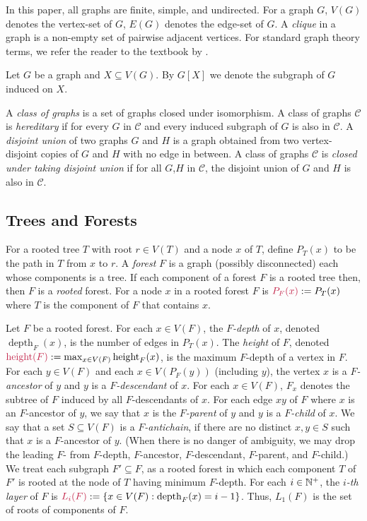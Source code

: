 \documentclass{patmorin}
\makeatletter
\newcommand{\defin}[1]{\emph{\textcolor{brightmaroon}{#1}}}
\def\mathcolor#1#{\@mathcolor{#1}}
\def\@mathcolor#1#2#3{%
  \protect\leavevmode
  \begingroup
    \color#1{#2}#3%
  \endgroup
}
\newcommand{\mathdefin}[1]{\mathcolor{brightmaroon}{#1}}
\DeclareMathOperator{\height}{height}
\DeclareMathOperator{\depth}{depth}
\makeatother
\begin{document}
  In this paper, all graphs are finite, simple, and undirected.  For a graph $G$, \defin{$V(G)$} denotes the vertex-set of $G$, \defin{$E(G)$} denotes the edge-set of $G$.  A \defin{clique} in a graph is a non-empty set of pairwise adjacent vertices. For standard graph theory terms, we refer the reader to the textbook by \citet{diestel:graph}.

  Let $G$ be a graph and $X\subseteq V(G)$. By $G[X]$ we denote the subgraph of $G$ induced on $X$.

  A \defin{class of graphs} is a set of graphs closed under isomorphism.
  A class of graphs $\mathcal{C}$ is \defin{hereditary} if for every $G$ in $\mathcal{C}$ and every induced subgraph of $G$ is also in $\mathcal{C}$.
  A \defin{disjoint union} of two graphs $G$ and $H$ is a graph obtained from two vertex-disjoint copies of $G$ and $H$ with no edge in between.
  A class of graphs $\mathcal{C}$ is \defin{closed under taking disjoint union} if for all $G$,$H$ in $\mathcal{C}$, the disjoint union of $G$ and $H$ is also in $\mathcal{C}$.



  \subsection{Trees and Forests}

  For a rooted tree $T$ with root $r\in V(T)$ and a node $x$ of $T$, define \defin{$P_T(x)$} to be the path in $T$ from $x$ to $r$.    A \defin{forest} $F$ is a graph (possibly disconnected) each whose components is a tree.  If each component of a forest $F$ is a rooted tree then, then $F$ is a \defin{rooted} forest. For a node $x$ in a rooted forest $F$ is $\mathdefin{P_F(x)}:=P_T(x)$ where $T$ is the component of $F$ that contains $x$.

  Let $F$ be a rooted forest.  For each $x\in V(F)$,
  the \defin{$F$-depth} of $x$, denoted \defin{$\depth_F(x)$}, is the number of edges in $P_T(x)$.
  The \defin{height} of $F$, denoted $\mathdefin{\height(F)}:=\max_{x\in V(F)}\height_F(x)$, is the maximum $F$-depth of a vertex in $F$.
  For each $y\in V(F)$ and each $x\in V(P_F(y))$ (including $y$),  the vertex $x$ is a \defin{$F$-ancestor} of $y$ and $y$ is a \defin{$F$-descendant} of $x$.  For each $x\in V(F)$, \defin{$F_x$} denotes the subtree of $F$ induced by all $F$-descendants of $x$.
  For each edge $xy$ of $F$ where $x$ is an $F$-ancestor of $y$, we say that $x$ is the \defin{$F$-parent} of $y$ and $y$ is a \defin{$F$-child} of $x$.
  We say that a set $S\subseteq V(F)$ is a \defin{$F$-antichain}, if there are no distinct $x,y\in S$ such that $x$ is a $F$-ancestor of $y$.  (When there is no danger of ambiguity, we may drop the leading $F$- from $F$-depth, $F$-ancestor, $F$-descendant, $F$-parent, and $F$-child.)
  We treat each subgraph $F'\subseteq F$, as a rooted forest in which each component $T$ of $F'$ is rooted at the node of $T$ having minimum $F$-depth.  For each $i\in\mathbb{N}^+$, the \defin{$i$-th layer} of $F$ is $\mathdefin{L_i(F)}:=\{x\in V(F):\depth_F(x)=i-1\}$.
  Thus, $L_1(F)$ is the set of roots of components of $F$.
\end{document}
